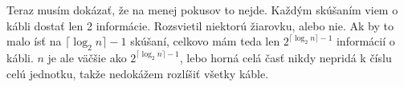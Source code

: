Teraz musím dokázať, že na menej pokusov to nejde. Každým skúšaním viem 
o kábli dostať len 2 informácie. Rozsvietil niektorú žiarovku, alebo nie. 
Ak by to malo ísť na $\lceil\log_2 n\rceil-1$ skúšaní, celkovo mám teda 
len $2^{\lceil\log_2 n\rceil-1}$ informácií o kábli. $n$ je ale väčšie 
ako $2^{\lceil\log_2 n\rceil-1}$, lebo horná celá časť nikdy nepridá 
k číslu celú jednotku, takže nedokážem rozlíšiť všetky káble. 

